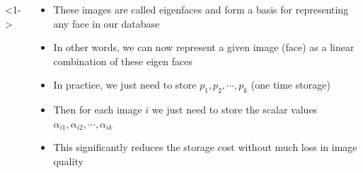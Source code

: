 \begin{frame}
\begin{columns}
    <1->
    \begin{overlayarea}{\textwidth}{\textheight}
      \begin{itemize}\justifying
        \item<1-> These images are called eigenfaces and form a basis for representing any face in our database
        \item<2-> In other words, we can now represent a given image (face) as a linear combination of these eigen faces
        \item<9-> In practice, we just need to store $p_1,p_2,\cdots,p_{k}$ (one time storage)
        \item<10-> Then for each image $i$ we just need to store the scalar values $\alpha_{i1},\alpha_{i2},\cdots,\alpha_{ik}$
        \item<11-> This significantly reduces the storage cost without much loss in image quality
      \end{itemize}
    \end{overlayarea}
  \end{columns}
\end{frame}